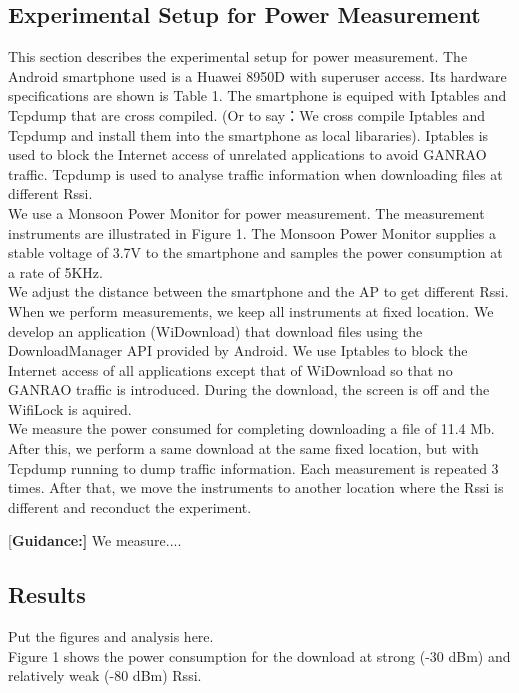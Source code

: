 \documentclass[journal]{IEEEtran}
\begin{document}
\subsection{Experimental Setup for Power Measurement}
This section describes the experimental setup for power measurement. The Android smartphone used 
is a Huawei 8950D with superuser access. Its hardware specifications are shown is Table 1. 
The smartphone is equiped with Iptables and Tcpdump that are cross compiled. 
(Or to say：We cross compile Iptables and Tcpdump and install them into the smartphone as local libararies).
Iptables is used to block the Internet access of unrelated applications to avoid GANRAO traffic. 
Tcpdump is used to analyse traffic information when downloading files at different Rssi. 
\\  
\indent  We use a Monsoon Power Monitor for power measurement. The measurement instruments are illustrated in Figure 1.
The Monsoon Power Monitor supplies a stable voltage of 3.7V to the smartphone and samples the power consumption at a rate of 5KHz. 
\\  
\indent  We adjust the distance between the smartphone and the AP to get different Rssi. 
When we perform measurements, we keep all instruments at fixed location. 
We develop an application (WiDownload) that download files 
using the DownloadManager API provided by Android. We use Iptables to block the Internet access of all applications 
except that of WiDownload so that no GANRAO traffic is introduced. 
During the download, the screen is off and the WifiLock is aquired. 
\\  
\indent We measure the power consumed for 
completing downloading a file of 11.4 Mb. After this, we perform a same download at the same fixed location, but with 
Tcpdump running to dump traffic information. Each measurement is repeated 3 times. After that, we move the instruments to 
another location where the Rssi is different and reconduct the experiment. 

{[\bf Guidance:]} We measure....

\subsection{Results}
Put the figures and analysis here.
\\
\indent Figure 1 shows the power consumption for the download at strong (-30 dBm) and relatively weak (-80 dBm) Rssi.
\end{document}

